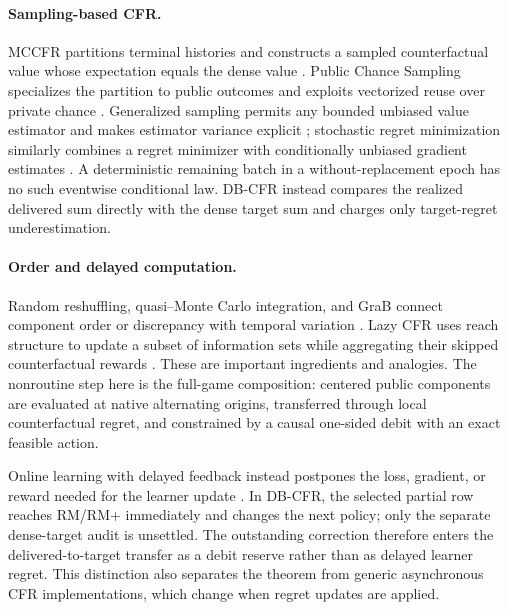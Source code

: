 \paragraph{Sampling-based CFR.}
MCCFR partitions terminal histories and constructs a sampled counterfactual
value whose expectation equals the dense value
\citep{lanctot2009mccfr}.  Public Chance Sampling specializes the partition to
public outcomes and exploits vectorized reuse over private chance
\citep{johanson2012pcs}.  Generalized sampling permits any bounded unbiased
value estimator and makes estimator variance explicit
\citep{gibson2012generalized}; stochastic regret minimization similarly
combines a regret minimizer with conditionally unbiased gradient estimates
\citep{farina2020stochastic}.  A deterministic remaining batch in a
without-replacement epoch has no such eventwise conditional law.  DB-CFR
instead compares the realized delivered sum directly with the dense target
sum and charges only target-regret underestimation.

\paragraph{Order and delayed computation.}
Random reshuffling, quasi--Monte Carlo integration, and GraB connect component
order or discrepancy with temporal variation
\citep{niederreiter1992qmc,lu2022grab,das2022withoutreplacement}.  Lazy CFR
uses reach structure to update a subset of information sets while aggregating
their skipped counterfactual rewards \citep{zhou2020lazy}.  These are important
ingredients and analogies.  The nonroutine step here is the full-game
composition: centered public components are evaluated at native alternating
origins, transferred through local counterfactual regret, and constrained by
a causal one-sided debit with an exact feasible action.

Online learning with delayed feedback instead postpones the loss, gradient,
or reward needed for the learner update
\citep{joulani2013delay,flaspohler2021delay}.  In DB-CFR, the selected partial
row reaches RM/RM+ immediately and changes the next policy; only the separate
dense-target audit is unsettled.  The outstanding correction therefore enters
the delivered-to-target transfer as a debit reserve rather than as delayed
learner regret.  This distinction also separates the theorem from generic
asynchronous CFR implementations, which change when regret updates are
applied.

